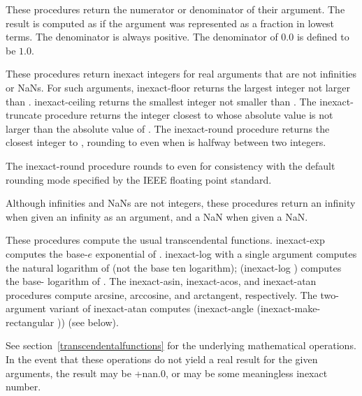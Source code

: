 \begin{entry}{%
}

These procedures return the numerator or denominator of their
argument.  The result is computed as if the argument was represented
as a fraction in lowest terms.  The denominator is always positive.
The denominator of $0.0$ is defined to be $1.0$.
\end{entry}

\begin{entry}{%
}

These procedures return inexact integers for real arguments that are
not infinities or NaNs.  For such arguments, {\cf inexact-floor}
returns the largest integer not larger than .  {\cf
  inexact-ceiling} returns the smallest integer not smaller than
.  The {\cf inexact-truncate} procedure returns the integer closest to
 whose absolute value is not larger than the absolute value of
.  The {\cf inexact-round} procedure returns the closest integer to
, rounding to even when  is halfway between two
integers.

\begin{rationale}
The {\cf inexact-round} procedure rounds to even for consistency with the default rounding
mode specified by the IEEE floating point standard.
\end{rationale}

Although infinities and NaNs are not integers, these procedures return
an infinity when given an infinity as an argument, and a NaN when
given a NaN.
\end{entry}

\begin{entry}{%
}

These procedures compute the usual transcendental functions.  {\cf
  inexact-exp} computes the base-$e$ exponential of .  {\cf
  inexact-log} with a single argument computes the natural logarithm
of  (not the base ten logarithm); {\cf (inexact-log 
  )} computes the base- logarithm of .
The {\cf inexact-asin}, {\cf inexact-acos}, and {\cf inexact-atan} procedures compute
arcsine, arccosine, and arctangent, respectively.  The two-argument
variant of {\cf inexact-atan} computes {\cf (inexact-angle
  (inexact-make-rectangular  ))} (see below).

See section~\ref{transcendentalfunctions} for the underlying
mathematical operations.  In the event that these operations do not
yield a real result for the given arguments, the result may be {\cf
  +nan.0}, or may be some meaningless inexact number.
\end{entry}

